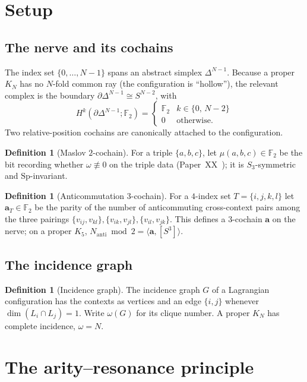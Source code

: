 \documentclass[11pt,a4paper]{article}
\newcommand{\Nanti}{N_{\mathrm{anti}}}
\newcommand{\Sp}{\mathrm{Sp}}
\newcommand{\F}{\mathbb{F}}
\theoremstyle{plain}
\theoremstyle{definition}
\newtheorem{definition}[theorem]{Definition}
\theoremstyle{remark}
\begin{document}
\section{Setup}\label{sec:setup}

\subsection{The nerve and its cochains}

The index set $\{0,\dots,N-1\}$ spans an abstract simplex $\Delta^{N-1}$.  Because a
proper $K_N$ has no $N$-fold common ray (the configuration is ``hollow''), the
relevant complex is the boundary $\partial\Delta^{N-1}\cong S^{N-2}$, with
\[
  H^k(\partial\Delta^{N-1};\F_2)=\begin{cases}\F_2 & k\in\{0,\,N-2\}\\ 0 &\text{otherwise.}\end{cases}
\]
Two relative-position cochains are canonically attached to the configuration.

\begin{definition}[Maslov $2$-cochain]
For a triple $\{a,b,c\}$, let $\mu(a,b,c)\in\F_2$ be the bit recording whether
$\omega\not\equiv0$ on the triple data (Paper~XX~\cite{PaperXX}); it is
$S_3$-symmetric and $\Sp$-invariant.
\end{definition}

\begin{definition}[Anticommutation $3$-cochain]
For a $4$-index set $T=\{i,j,k,l\}$ let $\mathbf a_T\in\F_2$ be the parity of the
number of anticommuting cross-context pairs among the three pairings
$\{v_{ij},v_{kl}\},\{v_{ik},v_{jl}\},\{v_{il},v_{jk}\}$.  This defines a $3$-cochain
$\mathbf a$ on the nerve; on a proper $K_5$, $\Nanti\bmod2=\langle\mathbf a,[S^3]\rangle$.
\end{definition}

\subsection{The incidence graph}

\begin{definition}[Incidence graph]
The incidence graph $G$ of a Lagrangian configuration has the contexts as vertices
and an edge $\{i,j\}$ whenever $\dim(L_i\cap L_j)=1$.  Write $\omega(G)$ for its
clique number.  A proper $K_N$ has complete incidence, $\omega=N$.
\end{definition}

\section{The arity--resonance principle}\label{sec:resonance}
\end{document}
